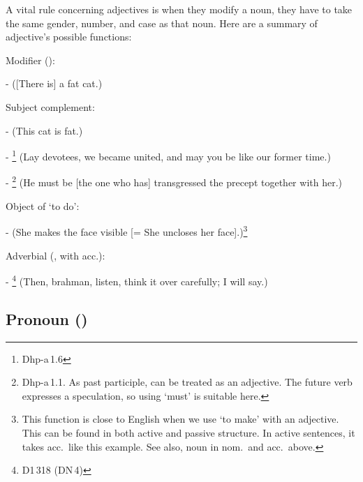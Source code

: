 A vital rule concerning adjectives is when they modify a noun, they have to take the same gender, number, and case as that noun. Here are a summary of adjective's possible functions:
\begin{compactenum}[(1)]
\item Modifier ():\par
-  ([There is] a fat cat.)\par
\item Subject complement:\par
-  (This cat is fat.)\par
- \footnote{Dhp-a\,1.6} (Lay devotees, we became united, and may you be like our former time.)\par
- \footnote{Dhp-a\,1.1. As past participle,  can be treated as an adjective. The future verb  expresses a speculation, so using `must' is suitable here.} (He must be [the one who has] transgressed the precept together with her.)\par
\item Object of `to do':\par
- (She makes the face visible [= She uncloses her face].)\footnote{This function is close to English when we use `to make' with an adjective. This  can be found in both active and passive structure. In active sentences, it takes acc.\ like this example. See also, noun in nom.\ and acc.\ above.}\par
\item Adverbial (, with acc.):\par
- \footnote{D1\,318 (DN\,4)} (Then, brahman, listen, think it over carefully; I will say.)\par
\end{compactenum}

{}
\subsection*{Pronoun ()} 

